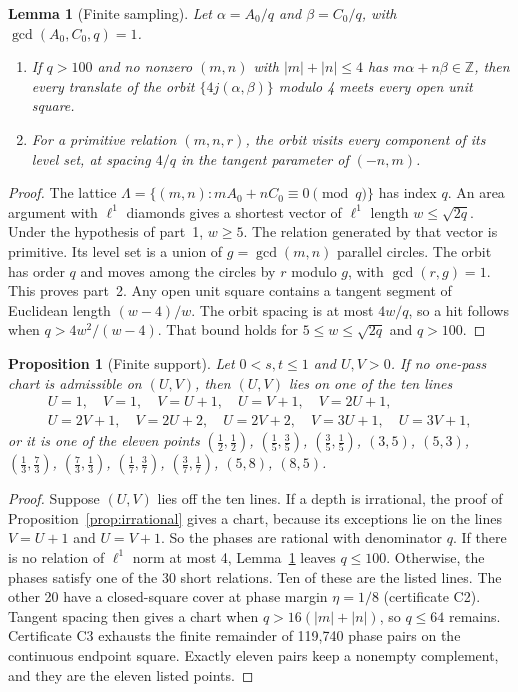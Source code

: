 \documentclass[11pt]{article}
\newtheorem{lemma}{Lemma}
\newtheorem{proposition}{Proposition}
\theoremstyle{remark}
\begin{document}
\begin{lemma}[Finite sampling]\label{lem:sampling}
Let $\alpha=A_0/q$ and $\beta=C_0/q$, with $\gcd(A_0,C_0,q)=1$.
\begin{enumerate}
\item If $q>100$ and no nonzero $(m,n)$ with $|m|+|n|\le4$ has $m\alpha+n\beta\in\mathbb{Z}$, then every translate of the orbit $\{4j(\alpha,\beta)\}$ modulo 4 meets every open unit square.
\item For a primitive relation $(m,n,r)$, the orbit visits every component of its level set, at spacing $4/q$ in the tangent parameter of $(-n,m)$.
\end{enumerate}
\end{lemma}
\begin{proof}
The lattice $\Lambda=\{(m,n):mA_0+nC_0\equiv0\pmod q\}$ has index $q$. An area argument with $\ell^1$ diamonds gives a shortest vector of $\ell^1$ length $w\le\sqrt{2q}$. Under the hypothesis of part~1, $w\ge5$. The relation generated by that vector is primitive. Its level set is a union of $g=\gcd(m,n)$ parallel circles. The orbit has order $q$ and moves among the circles by $r$ modulo $g$, with $\gcd(r,g)=1$. This proves part~2. Any open unit square contains a tangent segment of Euclidean length $(w-4)/w$. The orbit spacing is at most $4w/q$, so a hit follows when $q>4w^2/(w-4)$. That bound holds for $5\le w\le\sqrt{2q}$ and $q>100$.
\end{proof}

\begin{proposition}[Finite support]\label{prop:support}
Let $0<s,t\le1$ and $U,V>0$. If no one-pass chart is admissible on $(U,V)$, then $(U,V)$ lies on one of the ten lines
\[
\begin{gathered}U=1,\quad V=1,\quad V=U+1,\quad U=V+1,\quad V=2U+1,\\ U=2V+1,\quad V=2U+2,\quad U=2V+2,\quad V=3U+1,\quad U=3V+1,\end{gathered}
\]
or it is one of the eleven points $(\tfrac12,\tfrac12)$, $(\tfrac15,\tfrac35)$, $(\tfrac35,\tfrac15)$, $(3,5)$, $(5,3)$, $(\tfrac13,\tfrac73)$, $(\tfrac73,\tfrac13)$, $(\tfrac17,\tfrac37)$, $(\tfrac37,\tfrac17)$, $(5,8)$, $(8,5)$.
\end{proposition}
\begin{proof}
Suppose $(U,V)$ lies off the ten lines. If a depth is irrational, the proof of Proposition~\ref{prop:irrational} gives a chart, because its exceptions lie on the lines $V=U+1$ and $U=V+1$. So the phases are rational with denominator $q$. If there is no relation of $\ell^1$ norm at most 4, Lemma~\ref{lem:sampling} leaves $q\le100$. Otherwise, the phases satisfy one of the 30 short relations. Ten of these are the listed lines. The other 20 have a closed-square cover at phase margin $\eta=1/8$ (certificate C2). Tangent spacing then gives a chart when $q>16(|m|+|n|)$, so $q\le64$ remains. Certificate C3 exhausts the finite remainder of 119{,}740 phase pairs on the continuous endpoint square. Exactly eleven pairs keep a nonempty complement, and they are the eleven listed points.
\end{proof}
\end{document}
